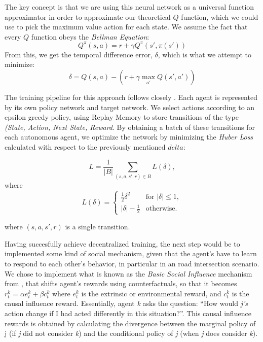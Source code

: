 The key concept is that we are using this neural network as a universal function approximator in order to approximate our theoretical $Q$ function, which we could use to pick the maximum value action for each state. We assume the fact that every $Q$ function obeys the \textit{Bellman Equation}:
\[
Q^\pi(s, a) = r + \gamma Q^\pi(s', \pi(s'))
\]
From this, we get the temporal difference error, $\delta$, which is what we attempt to minimize:
\[
\delta = Q(s, a) - \left(r + \gamma \max_{a'} Q(s', a')\right)
\]

The training pipeline for this approach follows closely \cite{pytorchrltutorial}. Each agent is represented by its own policy network and target network. We select actions according to an epsilon greedy policy, using Replay Memory to store transitions of the type \textit{(State, Action, Next State, Reward}. By obtaining a batch of these transitions for each autonomous agent, we optimize the network by minimizing the \textit{Huber Loss} calculated with respect to the previously mentioned $delta$:

\[
L = \frac{1}{|B|} \sum_{(s, a, s', r) \in B} L(\delta),
\]
where
\[
L(\delta) =
\begin{cases} 
\frac{1}{2}\delta^2 & \text{for } |\delta| \leq 1, \\
|\delta| - \frac{1}{2} & \text{otherwise}.
\end{cases}
\]

where $(s, a, s', r)$ is a single transition.

Having succesfully achieve decentralized training, the next step would be to implemented some kind of social mechanism, given that the agent's have to learn to respond to each other's behavior, in particular in an road intersection scenario. We chose to implement what is known as the \textit{Basic Social Influence} mechanism from \cite{jaques2019social}, that shifts agent's rewards using counterfactuals, so that it becomes $r^k_t = \alpha e^k_t + \beta c^k_t$ where $e^k_t$ is the extrinsic or environmental reward, and $c^k_t$ is the causal influence reward.  Essentially, agent \textit{k} asks the question: “How would \textit{j’s} action change if I had acted differently in this situation?”. This causal influence rewards is obtained by calculating the divergence between the marginal policy of j (if \textit{j} did not consider \textit{k}) and the conditional policy of \textit{j} (when \textit{j} does consider \textit{k}).

